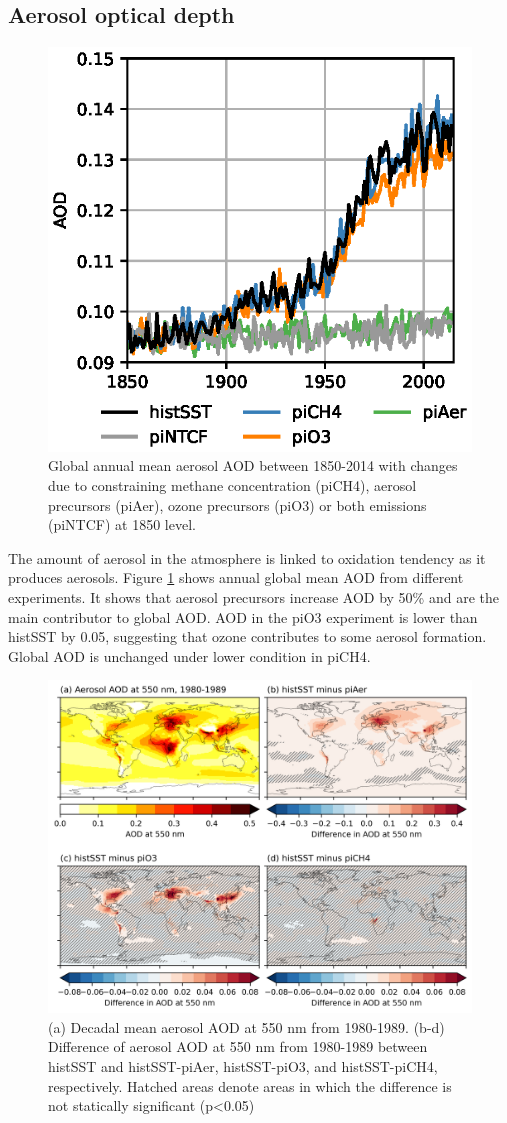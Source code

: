 \subsection{Aerosol optical depth}

\begin{figure}
    \centering
    \includegraphics[width=0.5\linewidth]{Chapter3/Figs/f05_aod-trend.eps}
    \caption{Global annual mean aerosol AOD between 1850-2014 with changes due to constraining  methane concentration (piCH4), aerosol precursors (piAer), ozone precursors (piO3) or both emissions (piNTCF) at 1850 level.}
    \label{fig:AOD}
\end{figure}


The amount of aerosol in the atmosphere is linked to  oxidation tendency as it produces  aerosols. Figure \ref{fig:AOD} shows annual global mean AOD from different experiments. It shows that aerosol precursors increase AOD by 50\% and are the main contributor to global AOD. AOD in the piO3 experiment is lower than histSST by 0.05, suggesting that ozone contributes to some aerosol formation. Global AOD is unchanged under lower  condition in piCH4.

\begin{figure}
    \centering
    \includegraphics[width=\linewidth]{Chapter3/Figs/f06_aod-map.png}
    \caption{(a) Decadal mean aerosol AOD at 550 nm from 1980-1989. (b-d) Difference of aerosol AOD at 550 nm from 1980-1989 between histSST and histSST-piAer, histSST-piO3, and histSST-piCH4, respectively. Hatched areas denote areas in which the difference is not statically significant (p<0.05)}
    \label{fig:AOD-map}
\end{figure}


